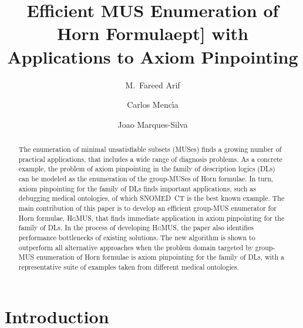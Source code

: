 \documentclass{llncs}
\newcommand{\elplain}{\xspace}
\newcommand{\hgmus}{\textsc{HgMUS}\xspace}
\begin{document}
\title{Efficient MUS Enumeration of Horn Formulae\2pt]
  with Applications to Axiom Pinpointing}
\author{M.\ Fareed Arif \and Carlos Menc\'{\i}a \and
  Joao Marques-Silva}

\maketitle              

\setcounter{footnote}{0}

\begin{abstract}
The enumeration of minimal unsatisfiable subsets (MUSes) finds a
growing number of practical applications, that includes a wide range
of diagnosis problems. 
As a concrete example, the problem of axiom pinpointing in the
\elplain family of description logics (DLs) can be modeled as the
enumeration of the group-MUSes of Horn formulae. In turn, axiom pinpointing
for the \elplain family of DLs finds important applications, 
such as debugging medical ontologies, of which SNOMED~CT is the best
known example.
The main contribution of this paper is to develop an efficient
group-MUS enumerator for Horn formulae, \hgmus, that finds immediate
application in axiom pinpointing for the \elplain family of DLs.
In the process of developing \hgmus, the paper also identifies
performance bottlenecks of existing solutions.
The new algorithm is shown to outperform all alternative approaches
when the problem domain targeted by group-MUS enumeration of Horn
formulae is axiom pinpointing for the \elplain family of DLs, with a
representative suite of examples taken from different medical
ontologies. 
\end{abstract}



\section{Introduction}
\end{document}
